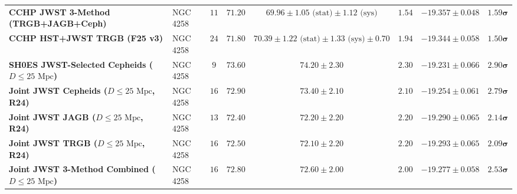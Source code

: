 \documentclass[aps,prd,preprint,superscriptaddress,nofootinbib]{revtex4-2}
\begin{document}
\begin{table}[!htbp]
{\begin{tabular}{llcccccc}
\textbf{CCHP JWST 3-Method (TRGB+JAGB+Ceph)} & NGC 4258 & $11$ & $71.20$ & $69.96 \pm 1.05\text{ (stat)} \pm 1.12\text{ (sys)}$ & $1.54$ & $-19.357 \pm 0.048$ & $\mathbf{1.59}\boldsymbol{\sigma}$ \\
\textbf{CCHP HST+JWST TRGB (F25 v3)} & NGC 4258 & $24$ & $71.80$ & $70.39 \pm 1.22\text{ (stat)} \pm 1.33\text{ (sys)} \pm 0.70$ & $1.94$ & $-19.344 \pm 0.058$ & $\mathbf{1.50}\boldsymbol{\sigma}$ \\
\midrule
\textbf{SH0ES JWST-Selected Cepheids ($D \le 25\text{ Mpc}$)} & NGC 4258 & $9$ & $73.60$ & $74.20 \pm 2.30$ & $2.30$ & $-19.231 \pm 0.066$ & $\mathbf{2.90}\boldsymbol{\sigma}$ \\
\textbf{Joint JWST Cepheids ($D \le 25\text{ Mpc}$, R24)} & NGC 4258 & $16$ & $72.90$ & $73.40 \pm 2.10$ & $2.10$ & $-19.254 \pm 0.061$ & $\mathbf{2.79}\boldsymbol{\sigma}$ \\
\textbf{Joint JWST JAGB ($D \le 25\text{ Mpc}$, R24)} & NGC 4258 & $13$ & $72.40$ & $72.20 \pm 2.20$ & $2.20$ & $-19.290 \pm 0.065$ & $\mathbf{2.14}\boldsymbol{\sigma}$ \\
\textbf{Joint JWST TRGB ($D \le 25\text{ Mpc}$, R24)} & NGC 4258 & $16$ & $72.50$ & $72.10 \pm 2.20$ & $2.20$ & $-19.293 \pm 0.065$ & $\mathbf{2.09}\boldsymbol{\sigma}$ \\
\textbf{Joint JWST 3-Method Combined ($D \le 25\text{ Mpc}$)} & NGC 4258 & $16$ & $72.80$ & $\mathbf{72.60 \pm 2.00}$ & $2.00$ & $-19.277 \pm 0.058$ & $\mathbf{2.53}\boldsymbol{\sigma}$ \\
\bottomrule
\end{tabular}%
}
\end{table}
\end{document}
